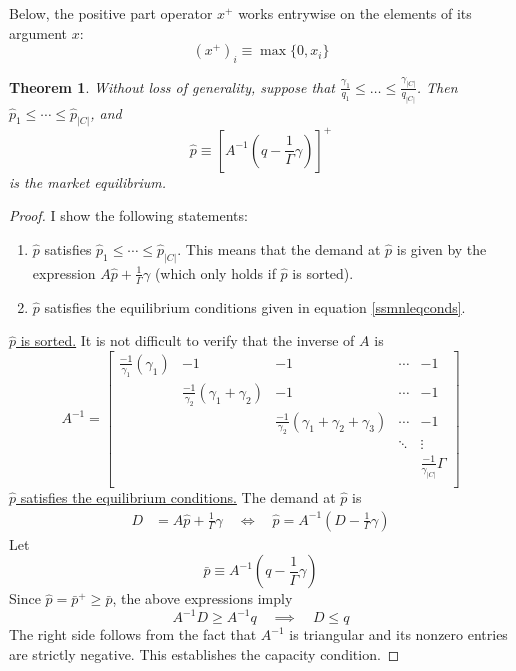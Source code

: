 \documentclass[12pt]{article}
\newtheorem{theorem}{Theorem}
\theoremstyle{definition}
\begin{document}
Below, the positive part operator $x^+$ works entrywise on the elements of its argument $x$:
\[(x^+)_i \equiv \max\{0, x_i\}\]

\begin{theorem}
Without loss of generality, suppose that $\frac{\gamma_1}{q_1} \leq \dots \leq \frac{\gamma_{|C|}}{q_{|C|}}$. Then $\hat p_1 \leq \cdots \leq \hat p_{|C|}$, and
\[\hat p \equiv \left[A^{-1} (q - \frac{1}{\Gamma} \gamma) \right]^+\]
is the market equilibrium.
\end{theorem} 

\begin{proof}
I show the following statements:
\begin{enumerate}
\item $\hat p$ satisfies $\hat p_1 \leq \cdots \leq \hat p_{|C|}$. This means that the demand at $\hat p$ is given by the expression $A \hat p + \frac{1}{\Gamma}\gamma$ (which only holds if $\hat p$ is sorted).
\item $\hat p$ satisfies the equilibrium conditions given in equation \eqref{ssmnleqconds}.
\end{enumerate}

\underline{$\hat p$ is sorted.} It is not difficult to verify that the inverse of $A$ is
\[A^{-1} = \begin{bmatrix}
\frac{-1}{\gamma_1}\left( \gamma_1 \right) & -1 & -1 &\cdots & -1 \\
 & \frac{-1}{\gamma_2}\left( \gamma_1 + \gamma_2 \right) & -1 &\cdots & -1 \\
 & & \frac{-1}{\gamma_2}\left( \gamma_1 + \gamma_2 + \gamma_3 \right) &\cdots & -1 \\
 &  &  & \ddots & \vdots \\
 & & & &  \frac{-1}{\gamma_{|C|}} \Gamma \\
\end{bmatrix}\]
\underline{$\hat p$ satisfies the equilibrium conditions.} The demand at $\hat p$ is 
\begin{align*}
D &= A \hat p + \frac{1}{\Gamma}\gamma\quad
\iff \quad \hat p = A^{-1} (D - \frac{1}{\Gamma} \gamma)
\end{align*}
Let
\[\bar p \equiv A^{-1} (q - \frac{1}{\Gamma} \gamma)\]
Since $\hat p = \bar p^+ \geq \bar p$, the above expressions imply
\[A^{-1} D \geq A^{-1} q \quad \implies \quad D \leq q\]
The right side follows from the fact that $A^{-1}$ is triangular and its nonzero entries are strictly negative. This establishes the capacity condition. 


\end{proof}
\end{document}
